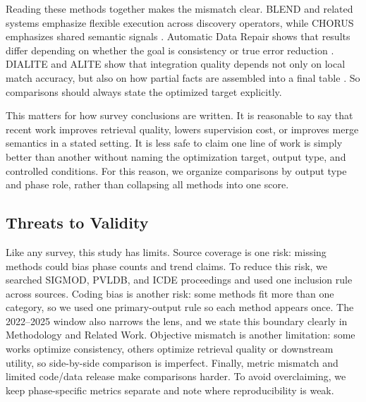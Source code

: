 \documentclass[sigconf,nonacm]{acmart}
\begin{document}
Reading these methods together makes the mismatch clear. BLEND and related systems emphasize flexible execution across discovery operators, while CHORUS emphasizes shared semantic signals \cite{11112882,10.14778/3659437.3659461}. Automatic Data Repair shows that results differ depending on whether the goal is consistency or true error reduction \cite{10.14778/3675034.3675051}. DIALITE and ALITE show that integration quality depends not only on local match accuracy, but also on how partial facts are assembled into a final table \cite{10.1145/3555041.3589732,10.14778/3574245.3574274}. So comparisons should always state the optimized target explicitly.

This matters for how survey conclusions are written. It is reasonable to say that recent work improves retrieval quality, lowers supervision cost, or improves merge semantics in a stated setting. It is less safe to claim one line of work is simply better than another without naming the optimization target, output type, and controlled conditions. For this reason, we organize comparisons by output type and phase role, rather than collapsing all methods into one score.

\subsection{Threats to Validity}
Like any survey, this study has limits. Source coverage is one risk: missing methods could bias phase counts and trend claims. To reduce this risk, we searched SIGMOD, PVLDB, and ICDE proceedings and used one inclusion rule across sources. Coding bias is another risk: some methods fit more than one category, so we used one primary-output rule so each method appears once. The 2022--2025 window also narrows the lens, and we state this boundary clearly in Methodology and Related Work. Objective mismatch is another limitation: some works optimize consistency, others optimize retrieval quality or downstream utility, so side-by-side comparison is imperfect. Finally, metric mismatch and limited code/data release make comparisons harder. To avoid overclaiming, we keep phase-specific metrics separate and note where reproducibility is weak.
\end{document}
